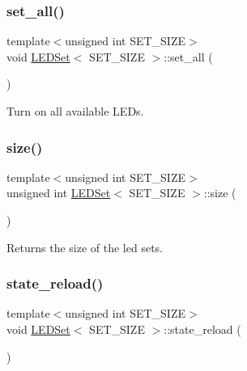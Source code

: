 \mbox{\label{classLEDSet_aaebfea59ba933621c4f7d7d405119702}} 
\subsubsection{\texorpdfstring{set\+\_\+all()}{set\_all()}}
{\footnotesize\ttfamily template$<$unsigned int S\+E\+T\+\_\+\+S\+I\+ZE$>$ \\
void \hyperlink{classLEDSet}{L\+E\+D\+Set}$<$ S\+E\+T\+\_\+\+S\+I\+ZE $>$\+::set\+\_\+all (\begin{DoxyParamCaption}{ }\end{DoxyParamCaption})\hspace{0.3cm}{\ttfamily [inline]}}



Turn on all available L\+E\+Ds. 

\mbox{\label{classLEDSet_a0d153646b1a750421af1f3617d90ad04}} 
\subsubsection{\texorpdfstring{size()}{size()}}
{\footnotesize\ttfamily template$<$unsigned int S\+E\+T\+\_\+\+S\+I\+ZE$>$ \\
unsigned int \hyperlink{classLEDSet}{L\+E\+D\+Set}$<$ S\+E\+T\+\_\+\+S\+I\+ZE $>$\+::size (\begin{DoxyParamCaption}{ }\end{DoxyParamCaption})\hspace{0.3cm}{\ttfamily [inline]}}



Returns the size of the led sets. 

\mbox{\label{classLEDSet_a520061aaf788486d2aa3aa3dfb3e32d6}} 
\subsubsection{\texorpdfstring{state\+\_\+reload()}{state\_reload()}}
{\footnotesize\ttfamily template$<$unsigned int S\+E\+T\+\_\+\+S\+I\+ZE$>$ \\
void \hyperlink{classLEDSet}{L\+E\+D\+Set}$<$ S\+E\+T\+\_\+\+S\+I\+ZE $>$\+::state\+\_\+reload (\begin{DoxyParamCaption}{ }\end{DoxyParamCaption})\hspace{0.3cm}{\ttfamily [inline]}}



